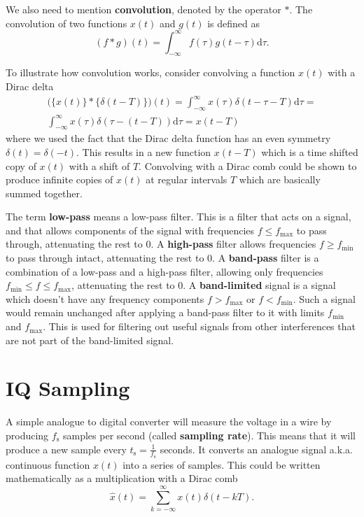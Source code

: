 \documentclass[a4paper,12pt,twoside,openright]{report}
\begin{document}
We also need to mention \textbf{convolution}, denoted by the operator $\ast$. The convolution of two functions $x(t)$ and $g(t)$ is defined as
$$(f \ast g)(t) = \int_{-\infty}^{\infty} f(\tau) g(t - \tau) \text{d} \tau .$$

To illustrate how convolution works, consider convolving a function $x(t)$ with a Dirac delta
\begin{multline}
\big( \{ x(t) \} \ast \{ \delta(t-T) \} \big)(t) =  \int_{-\infty}^{\infty} x(\tau) \delta(t - \tau - T ) \text{d} \tau = \\
\int_{-\infty}^{\infty} x(\tau) \delta( \tau - ( t -T) ) \text{d} \tau = x(t-T)
\end{multline}
where we used the fact that the Dirac delta function has an even symmetry $\delta(t) = \delta(-t)$. This results in a new function $x(t-T)$ which is a time shifted copy of $x(t)$ with a shift of $T$. Convolving with a Dirac comb could be shown to produce infinite copies of $x(t)$ at regular intervals $T$ which are basically summed together.

The term \textbf{low-pass} means a low-pass filter. This is a filter that acts on a signal, and that allows components of the signal with frequencies $f \leq f_\text{max}$ to pass through, attenuating the rest to 0. A \textbf{high-pass} filter allows frequencies $f \geq f_\text{min}$ to pass through intact, attenuating the rest to 0. A \textbf{band-pass} filter is a combination of a low-pass and a high-pass filter, allowing only frequencies $f_\text{min} \leq f \leq f_\text{max}$, attenuating the rest to 0. A \textbf{band-limited} signal is a signal which doesn't have any frequency components $f > f_\text{max}$ or $f < f_\text{min}$. Such a signal would remain unchanged after applying a band-pass filter to it with limits $f_\text{min}$ and $f_\text{max}$. This is used for filtering out useful signals from other interferences that are not part of the band-limited signal.

\section{IQ Sampling} 
\label{sec:IQSampling}

A simple analogue to digital converter will measure the voltage in a wire by producing $f_\text{s}$ samples per second (called \textbf{sampling rate}). This means that it will produce a new sample every $t_\text{s} = \frac{1}{f_\text{s}}$ seconds. It converts an analogue signal a.k.a. continuous function $x(t)$ into a series of samples. This could be written mathematically as a multiplication with a Dirac comb
\begin{equation}
\label{eq:sampling}
\hat{x}(t) = \sum_{k=-\infty}^{\infty} x(t) \delta(t - kT) .
\end{equation}
\end{document}
